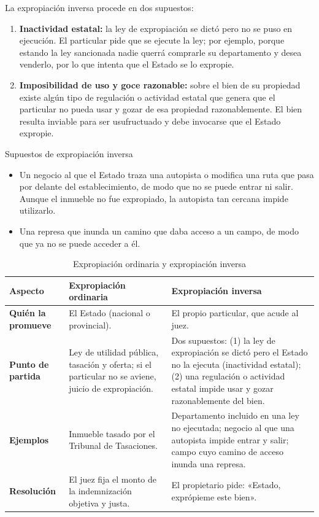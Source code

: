 \documentclass[12pt,oneside]{book}
\begin{document}
La expropiación inversa procede en dos supuestos:
\begin{enumerate}
    \item \textbf{Inactividad estatal:} la ley de expropiación se dictó pero no se puso en ejecución. El particular pide que se ejecute la ley; por ejemplo, porque estando la ley sancionada nadie querrá comprarle su departamento y desea venderlo, por lo que intenta que el Estado se lo expropie.
    \item \textbf{Imposibilidad de uso y goce razonable:} sobre el bien de su propiedad existe algún tipo de regulación o actividad estatal que genera que el particular no pueda usar y gozar de esa propiedad razonablemente. El bien resulta inviable para ser usufructuado y debe invocarse que el Estado expropie.
\end{enumerate}

\begin{example}{Supuestos de expropiación inversa}
\begin{itemize}
    \item Un negocio al que el Estado traza una autopista o modifica una ruta que pasa por delante del establecimiento, de modo que no se puede entrar ni salir. Aunque el inmueble no fue expropiado, la autopista tan cercana impide utilizarlo.
    \item Una represa que inunda un camino que daba acceso a un campo, de modo que ya no se puede acceder a él.
\end{itemize}
\end{example}

\begin{table}[H]
\centering
\small
\caption{Expropiación ordinaria y expropiación inversa}
\begin{tabularx}{\textwidth}{>{\raggedright\arraybackslash\bfseries}p{2.4cm} >{\raggedright\arraybackslash}X >{\raggedright\arraybackslash}X}
\toprule
Aspecto & Expropiación ordinaria & Expropiación inversa \\
\midrule
Quién la promueve & El Estado (nacional o provincial). & El propio particular, que acude al juez. \\
Punto de partida & Ley de utilidad pública, tasación y oferta; si el particular no se aviene, juicio de expropiación. & Dos supuestos: (1) la ley de expropiación se dictó pero el Estado no la ejecuta (inactividad estatal); (2) una regulación o actividad estatal impide usar y gozar razonablemente del bien. \\
Ejemplos & Inmueble tasado por el Tribunal de Tasaciones. & Departamento incluido en una ley no ejecutada; negocio al que una autopista impide entrar y salir; campo cuyo camino de acceso inunda una represa. \\
Resolución & El juez fija el monto de la indemnización objetiva y justa. & El propietario pide: «Estado, exprópieme este bien». \\
\bottomrule
\end{tabularx}
\end{table}
\end{document}
